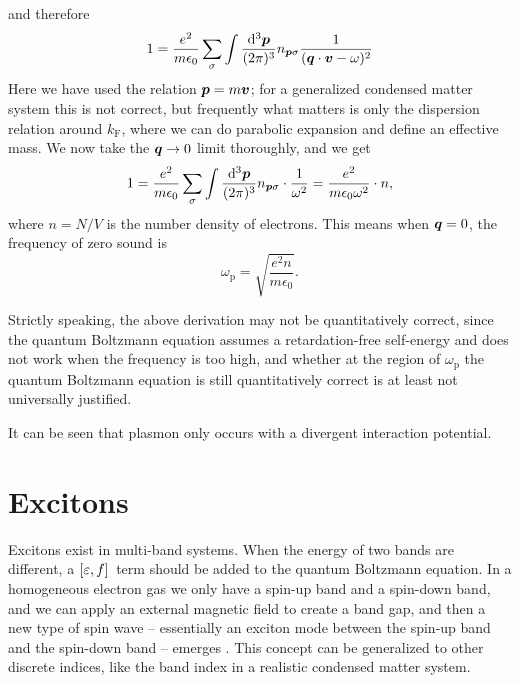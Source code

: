 \documentclass[hyperref, a4paper]{article}
\begin{document}
and therefore
\begin{equation}
    1 = \frac{e^2}{m \epsilon_0} \sum_\sigma \int \frac{\dd[3]{\vb*{p}}}{(2\pi)^3} 
    n_{\vb*{p} \sigma}
    \frac{1}{(\vb*{q} \cdot \vb*{v} - \omega)^2}
\end{equation}
Here we have used the relation $\vb*{p} = m \vb*{v}$;
for a generalized condensed matter system this is not correct, 
but frequently what matters is only the dispersion relation around $k_{\text{F}}$,
where we can do parabolic expansion 
and define an effective mass.
We now take the $\vb*{q} \to 0$ limit thoroughly, and we get 
\begin{equation}
    1 = \frac{e^2}{m \epsilon_0} \sum_{\sigma} \int \frac{\dd[3]{\vb*{p}}}{(2\pi)^3} n_{\vb*{p} \sigma}
    \cdot \frac{1}{\omega^2}
    = \frac{e^2}{m \epsilon_0 \omega^2} \cdot n,
\end{equation} 
where $n = N / V$ is the number density of electrons.
This means when $\vb*{q} = 0$, the frequency of zero sound is 
\begin{equation}
    \omega_{\text{p}} = \sqrt{\frac{e^2 n}{m \epsilon_0}}.
\end{equation}


Strictly speaking, the above derivation may not be quantitatively correct, 
since the quantum Boltzmann equation assumes 
a retardation-free self-energy 
and does not work when the frequency is too high, 
and whether at the region of $\omega_{\text{p}}$
the quantum Boltzmann equation is still quantitatively correct 
is at least not universally justified.

It can be seen that plasmon only occurs with a divergent interaction potential.

\section{Excitons}\label{sec:microscopic-bosonic-modes}

Excitons exist in multi-band systems.
When the energy of two bands are different, 
a $\comm*{\varepsilon}{f}$ term should be added to the quantum Boltzmann equation.
In a homogeneous electron gas 
we only have a spin-up band and a spin-down band, 
and we can apply an external magnetic field to create a band gap,
and then a new type of spin wave -- essentially an exciton mode 
between the spin-up band and the spin-down band -- emerges \cite{lifshitz2013statistical}.
This concept can be generalized to other discrete indices, 
like the band index in a realistic condensed matter system.
\end{document}
